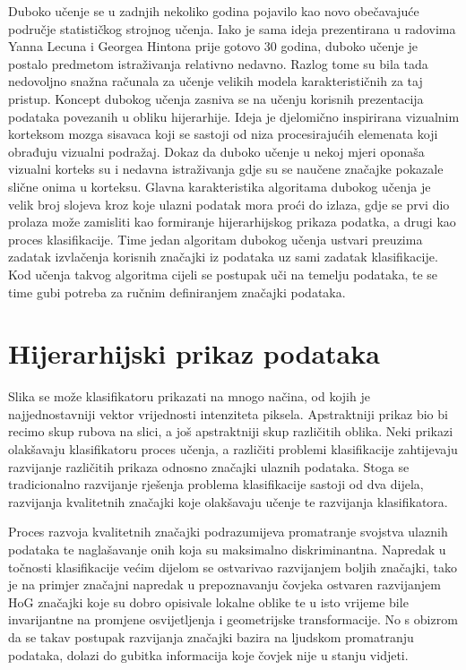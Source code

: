 \documentclass[lmodern, utf8, diplomski, numeric]{fer}
\begin{document}
Duboko učenje se u zadnjih nekoliko godina pojavilo kao novo obečavajuće područje statističkog strojnog učenja. Iako je sama ideja prezentirana u radovima Yanna Lecuna i Georgea Hintona prije gotovo 30 godina, duboko učenje je postalo predmetom istraživanja relativno nedavno. Razlog tome su bila tada nedovoljno snažna računala za učenje velikih modela karakterističnih za taj pristup. Koncept dubokog učenja zasniva se na učenju korisnih prezentacija podataka povezanih u obliku hijerarhije. Ideja je djelomično inspirirana vizualnim korteksom mozga sisavaca koji se sastoji od niza procesirajućih elemenata koji obrađuju vizualni podražaj. Dokaz da duboko učenje u nekoj mjeri oponaša vizualni korteks su i nedavna istraživanja gdje su se naučene značajke pokazale slične onima u korteksu. Glavna karakteristika algoritama dubokog učenja je velik broj slojeva kroz koje ulazni podatak mora proći do izlaza, gdje se prvi dio prolaza može zamisliti kao formiranje hijerarhijskog prikaza podatka, a drugi kao proces klasifikacije. Time jedan algoritam dubokog učenja ustvari preuzima zadatak izvlačenja korisnih značajki iz podataka uz sami zadatak klasifikacije. Kod učenja takvog algoritma cijeli se postupak uči na temelju podataka, te se time gubi potreba za ručnim definiranjem značajki podataka. 

\section{Hijerarhijski prikaz podataka}

Slika se može klasifikatoru prikazati na mnogo načina, od kojih je najjednostavniji vektor vrijednosti intenziteta piksela. Apstraktniji prikaz bio bi recimo skup rubova na slici, a još apstraktniji skup različitih oblika. Neki prikazi olakšavaju klasifikatoru proces učenja, a različiti problemi klasifikacije zahtijevaju razvijanje različitih prikaza odnosno značajki ulaznih podataka. Stoga  se tradicionalno razvijanje rješenja problema klasifikacije sastoji od dva dijela, razvijanja kvalitetnih značajki koje olakšavaju učenje te razvijanja klasifikatora. 

Proces razvoja kvalitetnih značajki podrazumijeva promatranje svojstva ulaznih podataka te naglašavanje onih koja su maksimalno diskriminantna. Napredak u točnosti klasifikacije većim dijelom se ostvarivao razvijanjem boljih značajki, tako je na primjer značajni napredak u prepoznavanju čovjeka ostvaren razvijanjem HoG značajki koje su dobro opisivale lokalne oblike te u isto vrijeme bile invarijantne na  promjene osvijetljenja i geometrijske transformacije. No s obizrom da se takav postupak razvijanja značajki bazira na ljudskom promatranju podataka, dolazi do gubitka informacija koje čovjek nije u stanju vidjeti. 
\end{document}
